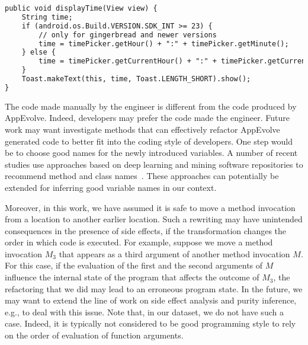 \vspace{0.7cm}
\vspace{0.5cm}\begin{lstlisting}[language=diff,numbers=none]
public void displayTime(View view) {
    String time;
    if (android.os.Build.VERSION.SDK_INT >= 23) {
        // only for gingerbread and newer versions
        time = timePicker.getHour() + ":" + timePicker.getMinute();
    } else {
        time = timePicker.getCurrentHour() + ":" + timePicker.getCurrentMinute();
    }
    Toast.makeText(this, time, Toast.LENGTH_SHORT).show();
}
\end{lstlisting}


\vspace{0.5cm}The code made manually by the engineer is different from the code produced
by AppEvolve. Indeed, developers may prefer the code made the
engineer. Future work may want investigate methods that can effectively
refactor AppEvolve generated code to better fit into the coding style of
developers. One step would be to choose good names for the newly introduced
variables. A number of recent studies use approaches based on deep learning
and mining software repositories to recommend method and class
names~\cite{allamanis2015suggesting}. These approaches can potentially be extended for inferring good
variable names in our context.



Moreover, in this work, we have assumed it is safe to move a method
invocation from a location to another earlier location. Such a rewriting
may have unintended consequences in the presence of side effects, if the
transformation changes the order in which code is executed.  For example,
suppose we move a method invocation $M_3$ that appears as a third argument
of another method invocation $M$. For this case, if the evaluation of the
first and the second arguments of $M$ influence the internal state of the
program that affects the outcome of $M_3$, the refactoring that we did may
lead to an erroneous program state. In the future, we may want to extend
the line of work on side effect analysis and purity inference, e.g., to
deal with this issue. Note that, in our dataset, we do not have such a
case.  Indeed, it is typically not considered to be good programming style
to rely on the order of evaluation of function arguments.





